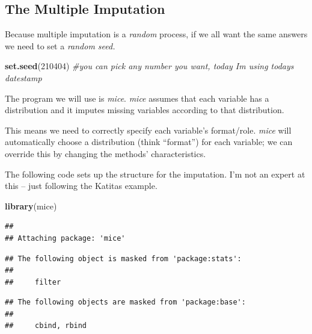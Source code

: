 \documentclass[
  11pt,
]{book}
\newenvironment{Shaded}{\begin{snugshade}}{\end{snugshade}}
\newcommand{\AttributeTok}[1]{\textcolor[rgb]{0.27,0.27,0.27}{#1}}
\newcommand{\CommentTok}[1]{\textcolor[rgb]{0.37,0.37,0.37}{\textit{#1}}}
\newcommand{\DecValTok}[1]{\textcolor[rgb]{0.06,0.06,0.06}{#1}}
\newcommand{\FunctionTok}[1]{\textcolor[rgb]{0.27,0.27,0.27}{\textbf{#1}}}
\newcommand{\NormalTok}[1]{#1}
\newcommand{\OtherTok}[1]{\textcolor[rgb]{0.37,0.37,0.37}{#1}}
\newcommand{\SpecialCharTok}[1]{\textcolor[rgb]{0.43,0.43,0.43}{\textbf{#1}}}
\begin{document}
\hypertarget{the-multiple-imputation}{%
\subsection{The Multiple Imputation}\label{the-multiple-imputation}}

Because multiple imputation is a \emph{random} process, if we all want the same answers we need to set a \emph{random seed.}

\begin{Shaded}
\begin{Highlighting}[]
\FunctionTok{set.seed}\NormalTok{(}\DecValTok{210404}\NormalTok{) }\CommentTok{\#you can pick any number you want, today I\textquotesingle{}m using today\textquotesingle{}s datestamp}
\end{Highlighting}
\end{Shaded}

The program we will use is \emph{mice}. \emph{mice} assumes that each variable has a distribution and it imputes missing variables according to that distribution.

This means we need to correctly specify each variable's format/role. \emph{mice} will automatically choose a distribution (think ``format'') for each variable; we can override this by changing the methods' characteristics.

The following code sets up the structure for the imputation. I'm not an expert at this -- just following the Katitas example.

\begin{Shaded}
\begin{Highlighting}[]
\FunctionTok{library}\NormalTok{(mice)}
\end{Highlighting}
\end{Shaded}

\begin{verbatim}
## 
## Attaching package: 'mice'
\end{verbatim}

\begin{verbatim}
## The following object is masked from 'package:stats':
## 
##     filter
\end{verbatim}

\begin{verbatim}
## The following objects are masked from 'package:base':
## 
##     cbind, rbind
\end{verbatim}

\begin{Shaded}
\end{Shaded}
\end{document}
